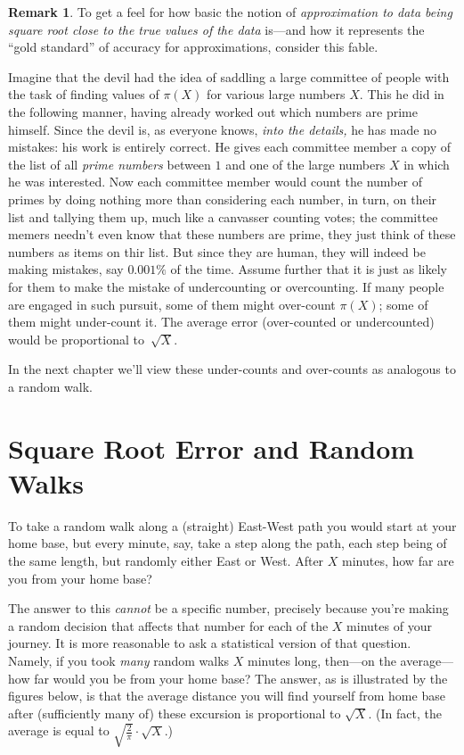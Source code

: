 \documentclass[openany]{book}
\theoremstyle{plain}
\theoremstyle{definition}
\newtheorem{remark}[theorem]{Remark}
\begin{document}
\begin{remark}
  To get a feel for how basic the notion of {\em approximation to data
    being square root close to the true values of the data} is---and
  how it represents the ``gold standard'' of accuracy for
  approximations, consider this fable.

  Imagine that the devil had the idea of saddling a large committee of
  people with the task of finding values of $\pi(X)$ for various large
  numbers $X$.  This he did in the following manner, having already
  worked out which numbers are prime himself. Since the devil is, as
  everyone knows, {\em into the details,} he has made no mistakes: his
  work is entirely correct.  He gives each committee member a copy of
  the list of all {\em prime numbers} between $1$ and one of the large
  numbers $X$ in which he was interested.  Now each committee member
  would count the number of primes by doing nothing more than
  considering each number, in turn, on their list and tallying them
  up, much like a canvasser counting votes; the committee memers  needn't even know that these numbers are prime, they just think of these numbers as items on thir list. But since they are human,
  they will indeed be making mistakes, say $0.001\%$ of the time.
  Assume further that it is just as likely for them to make the
  mistake of undercounting or overcounting.  If many people are
  engaged in such pursuit, some of them might over-count $\pi(X)$;
  some of them might under-count it. The average error (over-counted
  or undercounted) would be proportional to~${\sqrt X}$.

  In the next chapter we'll view these under-counts and over-counts as analogous to a random walk.


\end{remark}


\chapter{Square Root Error and Random Walks}

 To take a random walk along a (straight) East-West path  you would start at your home base, but every minute, say, take a step along the path, each step being of the same length, but randomly either East or West. After $X$ minutes, how far are you from your home base?

  The answer to this {\it cannot} be a specific number, precisely because you're making a random decision that affects that number for each of the $X$ minutes of your journey. It is more reasonable to ask a statistical version of that question. Namely, if you took {\it many} random walks $X$ minutes long, then---on the average---how far would you be from your home base?  The answer, as is illustrated by the figures below, is that the average distance you will find yourself from home base after (sufficiently many of) these excursion is proportional to ${\sqrt X}$. (In fact, the average is equal to $\sqrt{\frac{2}{\pi}}\cdot {\sqrt X}$.)
\end{document}
